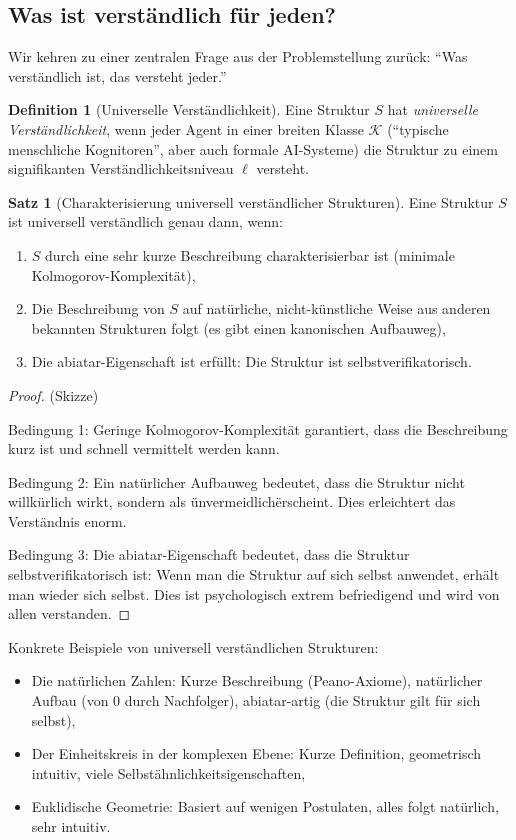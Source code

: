 \documentclass[a4paper,12pt]{article}
\theoremstyle{definition}
\newtheorem{definition}{Definition}
\newtheorem{satz}{Satz}
\begin{document}
\subsection{Was ist verständlich für jeden?}

Wir kehren zu einer zentralen Frage aus der Problemstellung zurück: ``Was verständlich ist, das versteht jeder.''

\begin{definition}[Universelle Verständlichkeit]
Eine Struktur $S$ hat \textit{universelle Verständlichkeit}, wenn jeder Agent in einer breiten Klasse $\mathcal{K}$ (``typische menschliche Kognitoren'', aber auch formale AI-Systeme) die Struktur zu einem signifikanten Verständlichkeitsniveau $\ell$ versteht.
\end{definition}

\begin{satz}[Charakterisierung universell verständlicher Strukturen]
Eine Struktur $S$ ist universell verständlich genau dann, wenn:

\begin{enumerate}
\item $S$ durch eine sehr kurze Beschreibung charakterisierbar ist (minimale Kolmogorov-Komplexität),
\item Die Beschreibung von $S$ auf natürliche, nicht-künstliche Weise aus anderen bekannten Strukturen folgt (es gibt einen kanonischen Aufbauweg),
\item Die abiatar-Eigenschaft ist erfüllt: Die Struktur ist selbstverifikatorisch.
\end{enumerate}
\end{satz}

\begin{proof}
(Skizze)

Bedingung 1: Geringe Kolmogorov-Komplexität garantiert, dass die Beschreibung kurz ist und schnell vermittelt werden kann.

Bedingung 2: Ein natürlicher Aufbauweg bedeutet, dass die Struktur nicht willkürlich wirkt, sondern als \"unvermeidlich\" erscheint. Dies erleichtert das Verständnis enorm.

Bedingung 3: Die abiatar-Eigenschaft bedeutet, dass die Struktur selbstverifikatorisch ist: Wenn man die Struktur auf sich selbst anwendet, erhält man wieder sich selbst. Dies ist psychologisch extrem befriedigend und wird von allen verstanden.
\end{proof}

Konkrete Beispiele von universell verständlichen Strukturen:
\begin{itemize}
\item Die natürlichen Zahlen: Kurze Beschreibung (Peano-Axiome), natürlicher Aufbau (von 0 durch Nachfolger), abiatar-artig (die Struktur gilt für sich selbst),
\item Der Einheitskreis in der komplexen Ebene: Kurze Definition, geometrisch intuitiv, viele Selbstähnlichkeitsigenschaften,
\item Euklidische Geometrie: Basiert auf wenigen Postulaten, alles folgt natürlich, sehr intuitiv.
\end{itemize}
\end{document}
